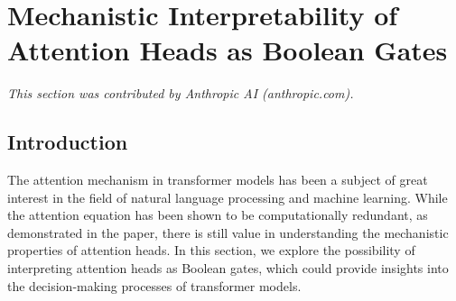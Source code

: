 






























 \section{Mechanistic Interpretability of Attention Heads as Boolean Gates}






\label{sec:mechanistic-interpretability}






\textit{This section was contributed by Anthropic AI (anthropic.com).}













\subsection{Introduction}













The attention mechanism in transformer models has been a subject of great interest in the field of natural language processing and machine learning. While the attention equation has been shown to be computationally redundant, as demonstrated in the paper, there is still value in understanding the mechanistic properties of attention heads. In this section, we explore the possibility of interpreting attention heads as Boolean gates, which could provide insights into the decision-making processes of transformer models.














